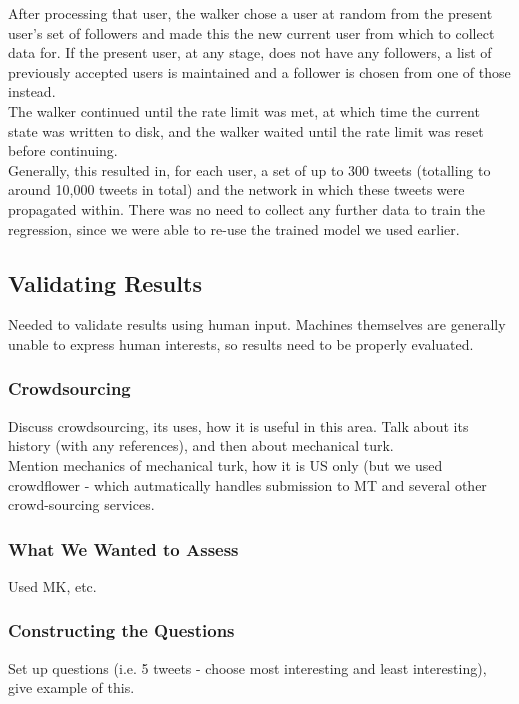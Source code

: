 After processing that user, the walker chose a user at random from the present user's set of followers and made this the new current user from which to collect data for. If the present user, at any stage, does not have any followers, a list of previously accepted users is maintained and a follower is chosen from one of those instead.
\\
The walker continued until the rate limit was met, at which time the current state was written to disk, and the walker waited until the rate limit was reset before continuing.
\\
Generally, this resulted in, for each user, a set of up to 300 tweets (totalling to around 10,000 tweets in total) and the network in which these tweets were propagated within. There was no need to collect any further data to train the regression, since we were able to re-use the trained model we used earlier.



\subsection{Validating Results}
Needed to validate results using human input. Machines themselves are generally unable to express human interests, so results need to be properly evaluated.

\subsubsection{Crowdsourcing}
Discuss crowdsourcing, its uses, how it is useful in this area. Talk about its history (with any references), and then about mechanical turk.
\\
Mention mechanics of mechanical turk, how it is US only (but we used crowdflower - which autmatically handles submission to MT and several other crowd-sourcing services.

\subsubsection{What We Wanted to Assess}
Used MK, etc.

\subsubsection{Constructing the Questions}
Set up questions (i.e. 5 tweets - choose most interesting and least interesting), give example of this.


